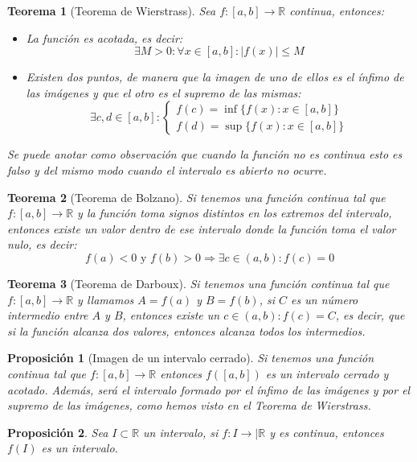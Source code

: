 \documentclass[10pt,a4paper,openright]{book}
\newtheorem{teorema}{Teorema}[chapter]
\newtheorem{proposicion}{Proposición}[chapter]
\begin{document}
\begin{teorema}[Teorema de Wierstrass]
Sea $f:[a,b] \rightarrow \mathbb R$ continua, entonces:
\begin{itemize}
\item La función es acotada, es decir:
$$\exists M>0: \forall x\in [a,b]: |f(x)|\leq M$$

\item Existen dos puntos, de manera que la imagen de uno de ellos es el ínfimo de las imágenes y que el otro es el supremo de las mismas:
$$\exists c,d\in [a,b]: \begin{cases} f(c)=\inf\{f(x): x\in [a,b]\} \\ f(d)=\sup\{f(x): x\in [a,b]\}\end{cases}$$

\end{itemize}
Se puede anotar como observación que cuando la función no es continua esto es falso y del mismo modo cuando el intervalo es abierto no ocurre.
\end{teorema}

\begin{teorema}[Teorema de Bolzano]
Si tenemos una función continua tal que $f:[a,b] \rightarrow \mathbb R$ y la función toma signos distintos en los extremos del intervalo, entonces existe un valor dentro de ese intervalo donde la función toma el valor nulo, es decir:
$$f(a)<0 \mbox{ y } f(b)>0\Rightarrow \exists c\in (a,b): f(c)=0$$
\end{teorema}

\begin{teorema}[Teorema de Darboux]
Si tenemos una función continua tal que $f:[a,b] \rightarrow \mathbb R$ y llamamos $A=f(a)$ y $B=f(b)$, si $C$ es un número intermedio entre $A$ y $B$, entonces existe un $c\in(a,b): f(c)=C$, es decir, que si la función alcanza dos valores, entonces alcanza todos los intermedios.
\end{teorema}

\begin{proposicion}[Imagen de un intervalo cerrado]
Si tenemos una función continua tal que $f:[a,b] \rightarrow \mathbb R$ entonces $f([a,b])$ es un intervalo cerrado y acotado. Además, será el intervalo formado por el ínfimo de las imágenes y por el supremo de las imágenes, como hemos visto en el Teorema de Wierstrass.
\end{proposicion}

\begin{proposicion}
Sea $I\subset \mathbb R$ un intervalo, si $f: I\rightarrow |\mathbb R$ y es continua, entonces $f(I)$ es un intervalo.
\end{proposicion}
\end{document}

